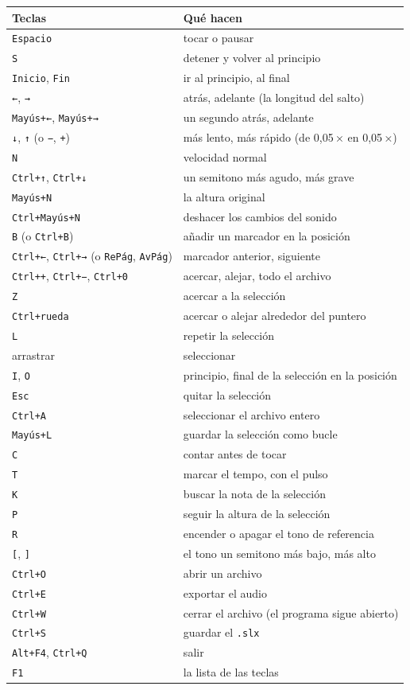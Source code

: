 \documentclass[12pt,
              article,
              oneside
              ]{memoir}
\newcommand*{\key}[1]{\texttt{#1}}
\begin{document}
%
\begin{longtable}{@{}p{}p{}@{}}
\toprule
\textbf{Teclas} & \textbf{Qué hacen}\\
\midrule
\endhead
\key{Espacio} & tocar o pausar\\
\key{S} & detener y volver al principio\\
\key{Inicio}, \key{Fin} & ir al principio, al final\\
\key{←}, \key{→} & atrás, adelante (la longitud del salto)\\
\key{Mayús+←}, \key{Mayús+→} & un segundo atrás, adelante\\
\key{↓}, \key{↑} (o \key{−}, \key{+}) & más lento, más rápido (de 0,05\,× en 0,05\,×)\\
\key{N} & velocidad normal\\
\key{Ctrl+↑}, \key{Ctrl+↓} & un semitono más agudo, más grave\\
\key{Mayús+N} & la altura original\\
\key{Ctrl+Mayús+N} & deshacer los cambios del sonido\\
\key{B} (o \key{Ctrl+B}) & añadir un marcador en la posición\\
\key{Ctrl+←}, \key{Ctrl+→} (o \key{RePág}, \key{AvPág}) & marcador anterior, siguiente\\
\key{Ctrl++}, \key{Ctrl+−}, \key{Ctrl+0} & acercar, alejar, todo el archivo\\
\key{Z} & acercar a la selección\\
\key{Ctrl+rueda} & acercar o alejar alrededor del puntero\\
\key{L} & repetir la selección\\
arrastrar & seleccionar\\
\key{I}, \key{O} & principio, final de la selección en la posición\\
\key{Esc} & quitar la selección\\
\key{Ctrl+A} & seleccionar el archivo entero\\
\key{Mayús+L} & guardar la selección como bucle\\
\key{C} & contar antes de tocar\\
\key{T} & marcar el tempo, con el pulso\\
\key{K} & buscar la nota de la selección\\
\key{P} & seguir la altura de la selección\\
\key{R} & encender o apagar el tono de referencia\\
\key{[}, \key{]} & el tono un semitono más bajo, más alto\\
\key{Ctrl+O} & abrir un archivo\\
\key{Ctrl+E} & exportar el audio\\
\key{Ctrl+W} & cerrar el archivo (el programa sigue abierto)\\
\key{Ctrl+S} & guardar el \texttt{.slx}\\
\key{Alt+F4}, \key{Ctrl+Q} & salir\\
\key{F1} & la lista de las teclas\\
\bottomrule
\end{longtable}
\end{document}
